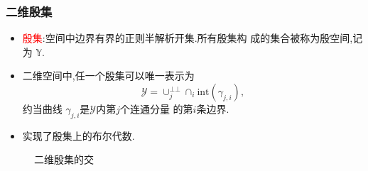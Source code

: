 \documentclass[UTF8]{ctexbeamer}	%
\theoremstyle{plain}
\theoremstyle{definition}
\theoremstyle{remark}
\numberwithin{equation}{section}
\begin{document}
\begin{frame}
    \frametitle{二维殷集}
    \begin{itemize}
        \item \textcolor{red}{殷集}:空间中边界有界的正则半解析开集.所有殷集构
              成的集合被称为殷空间,记为 $\mathbb{Y}$.
        \item 二维空间中,任一个殷集可以唯一表示为
              \[\mathcal{Y} = \cup_j^{\bot \bot}\cap_i \text{int}(\gamma_{j, i} ),\]
              约当曲线 $\gamma_{j, i}$是$\mathcal{Y}$内第$j$个连通分量
              的第$i$条边界.
        \item 实现了殷集上的布尔代数.
    \end{itemize}
    \begin{figure}[!htb]
        \centering
        \caption{二维殷集的交}
    \end{figure}
\end{frame}
\end{document}
